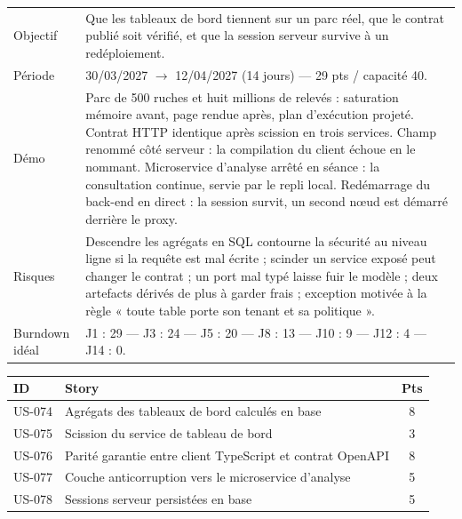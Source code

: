 \begin{center}
\begin{tabular}{lp{11cm}}
\toprule
Objectif  & Que les tableaux de bord tiennent sur un parc réel, que le contrat
            publié soit vérifié, et que la session serveur survive à un
            redéploiement. \\
Période   & 30/03/2027 $\rightarrow$ 12/04/2027 (14 jours) --- 29 pts / capacité 40. \\
Démo      & Parc de 500 ruches et huit millions de relevés : saturation mémoire
            avant, page rendue après, plan d'exécution projeté. Contrat HTTP
            identique après scission en trois services. Champ renommé côté
            serveur : la compilation du client échoue en le nommant.
            Microservice d'analyse arrêté en séance : la consultation continue,
            servie par le repli local. Redémarrage du back-end en direct : la
            session survit, un second n{\oe}ud est démarré derrière le proxy. \\
Risques   & Descendre les agrégats en SQL contourne la sécurité au niveau ligne
            si la requête est mal écrite ; scinder un service exposé peut
            changer le contrat ; un port mal typé laisse fuir le modèle ; deux
            artefacts dérivés de plus à garder frais ; exception motivée à la
            règle « toute table porte son tenant et sa politique ». \\
Burndown idéal & J1 : 29 --- J3 : 24 --- J5 : 20 --- J8 : 13 --- J10 : 9 --- J12 : 4 --- J14 : 0. \\
\bottomrule
\end{tabular}
\end{center}

\begin{center}
\begin{tabular}{lp{9cm}c}
\toprule
\textbf{ID} & \textbf{Story} & \textbf{Pts} \\
\midrule
US-074 & Agrégats des tableaux de bord calculés en base             & 8 \\
US-075 & Scission du service de tableau de bord                     & 3 \\
US-076 & Parité garantie entre client TypeScript et contrat OpenAPI & 8 \\
US-077 & Couche anticorruption vers le microservice d'analyse       & 5 \\
US-078 & Sessions serveur persistées en base                        & 5 \\
\bottomrule
\end{tabular}
\end{center}

